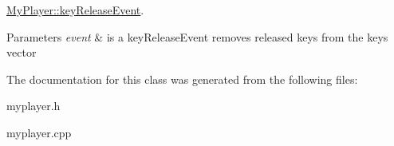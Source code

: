 \hyperlink{class_my_player_a72361f5f9b601a37e3cda0207657d2e9}{My\+Player\+::key\+Release\+Event}. 


\begin{DoxyParams}{Parameters}
{\em event} & is a key\+Release\+Event removes released keys from the keys vector \\
\hline
\end{DoxyParams}


The documentation for this class was generated from the following files\+:\begin{DoxyCompactItemize}
\item 
myplayer.\+h\item 
myplayer.\+cpp\end{DoxyCompactItemize}
